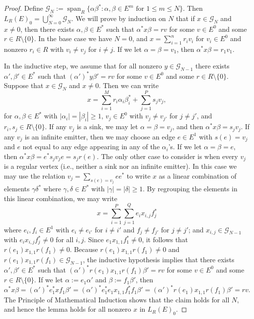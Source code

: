 \documentclass[11pt]{amsart}
\theoremstyle{remark}
\numberwithin{equation}{section}
\newcommand{\G}{\mathcal{G}}
\newcommand{\algspan}{\operatorname{span}}
\begin{document}
\begin{proof}
Define $\G_N := \algspan_{R} \{ \alpha \beta^* : \alpha, \beta \in E^m \text{ for } 1 \leq m \leq N \}$.  Then $L_R(E)_0 = \bigcup_{N=0}^\infty \G_N$.  We will prove by induction on $N$ that if $x \in \G_N$ and $x \neq 0$, then there exists $\alpha, \beta \in E^*$ such that $\alpha^* x \beta = rv$ for some $v \in E^0$ and some $r \in R \setminus \{ 0 \}$.  In the base case we have $N=0$, and $x = \sum_{i=1}^n r_i v_i$ for $v_i \in E^0$ and nonzero $r_i \in R$ with $v_i \neq v_j$ for $i \neq j$.  If we let $\alpha = \beta = v_1$, then $\alpha^* x \beta = r_1 v_1$.  

In the inductive step, we assume that for all nonzero $y \in \G_{N-1}$ there exists $\alpha', \beta' \in E^*$ such that $(\alpha')^* y \beta' = rv$ for some $v \in E^0$ and some $r \in R \setminus \{ 0 \}$.  Suppose that $x \in \G_N$ and $x \neq 0$.  Then we can write $$x = \sum_{i=1}^M r_i \alpha_i \beta_i^* + \sum_{j=1}^P s_j v_j,$$ for $\alpha, \beta \in E^*$ with $| \alpha_i | = | \beta_i | \geq 1$, $v_j \in E^0$ with $v_j \neq v_{j'}$ for $j \neq j'$, and $r_i, s_j \in R \setminus \{ 0 \}$.  If any $v_j$ is a sink, we may let $\alpha = \beta = v_j$, and then $\alpha^* x \beta = s_j v_j$.  If any $v_j$ is an infinite emitter, then we may choose an edge $e \in E^1$ with $s(e) = v_j$ and $e$ not equal to any edge appearing in any of the $\alpha_i$'s.  If we let $\alpha = \beta = e$, then $\alpha^* x \beta = e^* s_j v_j e = s_j r(e)$.  The only other case to consider is when every $v_j$ is a regular vertex (i.e., neither a sink nor an infinite emitter).  In this case we may use the relation $v_j = \sum_{s(e)=v_j} ee^*$ to write $x$ as a linear combination of elements $\gamma \delta^*$ where $\gamma, \delta \in E^*$ with $|\gamma| = |\delta | \geq 1$.  By regrouping the elements in this linear combination, we may write $$x = \sum_{i=1}^P \sum_{j=1}^Q e_i x_{i,j} f_j^*$$ where $e_i, f_i \in E^1$ with $e_i \neq e_{i'}$ for $i \neq i'$ and $f_j \neq f_{j'} $ for $j \neq j'$; and $x_{i,j} \in \G_{N-1}$ with $e_i x_{i,j} f_j^* \neq 0$ for all $i,j$.    Since $e_1 x_{1,1} f_1^* \neq 0$, it follows that $r(e_1) x_{1,1} r(f_1) \neq 0$.  Because $r(e_1) x_{1,1} r(f_1) \neq 0$ and $r(e_1) x_{1,1} r(f_1) \in \G_{N-1}$, the inductive hypothesis implies that there exists $\alpha', \beta' \in E^*$ such that $(\alpha')^* r(e_1) x_{1,1} r(f_1) \beta' = rv$ for some $v \in E^0$ and some $r \in R \setminus \{ 0 \}$.  If we let $\alpha := e_1 \alpha'$ and $\beta := f_1 \beta'$, then $$\alpha^* x \beta = (\alpha')^* e_1^* x  f_1 \beta' = (\alpha')^* e_1^*e_1 x_{1,1} f_1^* f_1 \beta' = (\alpha')^* r(e_1) x_{1,1} r(f_1) \beta' = rv.$$  The Principle of Mathematical Induction shows that the claim holds for all $N$, and hence the lemma holds for all nonzero $x$ in $L_R(E)_0$.
\end{proof}
\end{document}
